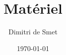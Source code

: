 \documentclass{beamer}
\title{Matériel}
\subtitle{}
\author{Dimitri de Smet}
\institute{UCL}
\date{\today}
\begin{document}

\begin{frame}
\titlepage
\end{frame}






\end{document}
